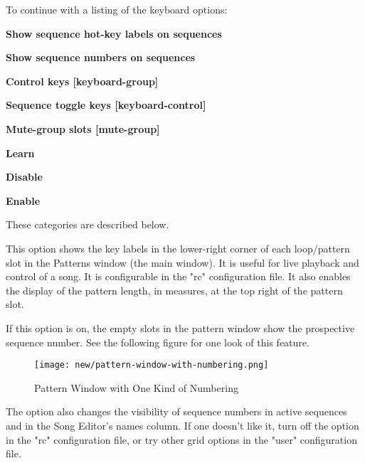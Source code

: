    To continue with a listing of the keyboard options:

   \begin{enumber}
      \item \textbf{Show sequence hot-key labels on sequences}
      \item \textbf{Show sequence numbers on sequences}
      \item \textbf{Control keys [keyboard-group]}
      \item \textbf{Sequence toggle keys [keyboard-control]}
      \item \textbf{Mute-group slots [mute-group]}
      \item \textbf{Learn}
      \item \textbf{Disable}
      \item \textbf{Enable}
   \end{enumber}

   These categories are described below.

   \setcounter{ItemCounter}{0}      %

   This option shows the key labels in the lower-right corner of
   each loop/pattern slot in the Patterns window (the main window).
   It is useful for live playback and control of a song.
   It is configurable in the "rc" configuration file.
   It also enables the display of the pattern length, in
   measures, at the top right of the pattern slot.

   If this option is on, the
   empty slots in the pattern window show the prospective sequence number.
   See the following figure for one look of this feature.

\begin{figure}[H]
   \centering 
   \texttt{[image: new/pattern-window-with-numbering.png]}
   \caption{Pattern Window with One Kind of Numbering}
   \label{fig:seq64_build_with_numbering}
\end{figure}

   The option also changes the visibility of sequence numbers
   in active sequences and in the Song Editor's names column.
   If one doesn't like it, turn off the option in the "rc" configuration file,
   or try other grid options in the "user" configuration file.

